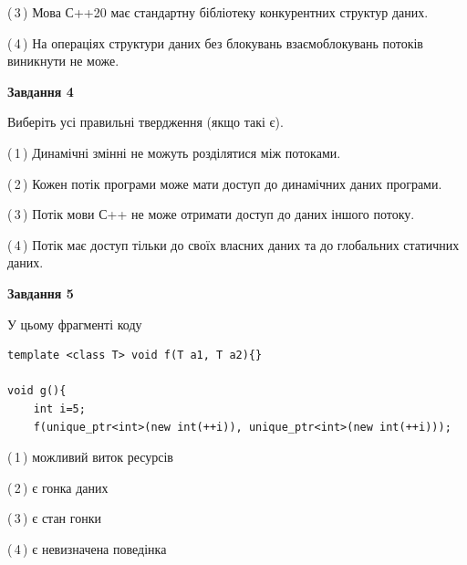 \documentclass[12pt, ukrainian]{article}
\begin{document}
\begin {large}
{(\,3\,) Мова С++20 має стандартну бібліотеку конкурентних структур даних.%

(\,4\,) На операціях структури даних без блокувань взаємоблокувань потоків виникнути не може.%



\begin{center}
\textbf{Завдання 4}
\end{center}
Виберіть усі правильні твердження (якщо такі є).\par
\vspace{2mm}

(\,1\,) Динамічні змінні не можуть розділятися між потоками.%

(\,2\,) Кожен потік програми може мати доступ до динамічних даних програми.%

(\,3\,) Потік мови С++ не може отримати доступ до даних іншого потоку.%

(\,4\,) Потік має доступ тільки до своїх власних даних та до глобальних статичних даних.%



\begin{center}
\textbf{Завдання 5}
\end{center}
У цьому фрагменті коду
\begin{verbatim}
template <class T> void f(T a1, T a2){}

void g(){
    int i=5;
    f(unique_ptr<int>(new int(++i)), unique_ptr<int>(new int(++i)));
\end{verbatim}

(\,1\,) можливий виток ресурсів%

(\,2\,) є гонка даних%

(\,3\,) є стан гонки%

(\,4\,) є невизначена поведінка%


}
\end {large}
\end{document}
